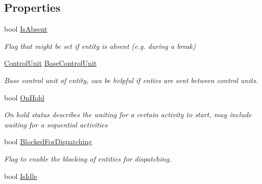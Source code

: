 \subsection*{Properties}
\begin{DoxyCompactItemize}
\item 
bool \hyperlink{class_simulation_core_1_1_h_c_c_m_elements_1_1_entity_staff_a3ea1cb0cd0a8749c06b277214e56ac81}{Is\+Absent}
\begin{DoxyCompactList}\small\item\em Flag that might be set if entity is absent (e.\+g. during a break) \end{DoxyCompactList}\item 
\hyperlink{class_simulation_core_1_1_h_c_c_m_elements_1_1_control_unit}{Control\+Unit} \hyperlink{class_simulation_core_1_1_h_c_c_m_elements_1_1_entity_staff_a29abdc843b6c18f0e59519dfd74fe6c7}{Base\+Control\+Unit}
\begin{DoxyCompactList}\small\item\em Base control unit of entity, can be helpful if enties are sent between control units. \end{DoxyCompactList}\item 
bool \hyperlink{class_simulation_core_1_1_h_c_c_m_elements_1_1_entity_staff_a74900ce804f001734277a61ab3317f71}{On\+Hold}
\begin{DoxyCompactList}\small\item\em On hold status describes the waiting for a certain activity to start, may include waiting for a sequential activities \end{DoxyCompactList}\item 
bool \hyperlink{class_simulation_core_1_1_h_c_c_m_elements_1_1_entity_staff_aca60d68b8ae631a3b9b5bc31420a3edb}{Blocked\+For\+Dispatching}
\begin{DoxyCompactList}\small\item\em Flag to enable the blocking of entities for dispatching. \end{DoxyCompactList}\item 
bool \hyperlink{class_simulation_core_1_1_h_c_c_m_elements_1_1_entity_staff_a84eb0c8740d3bfb6c6e04e5fdac85b64}{Is\+Idle}

\end{DoxyCompactItemize}
